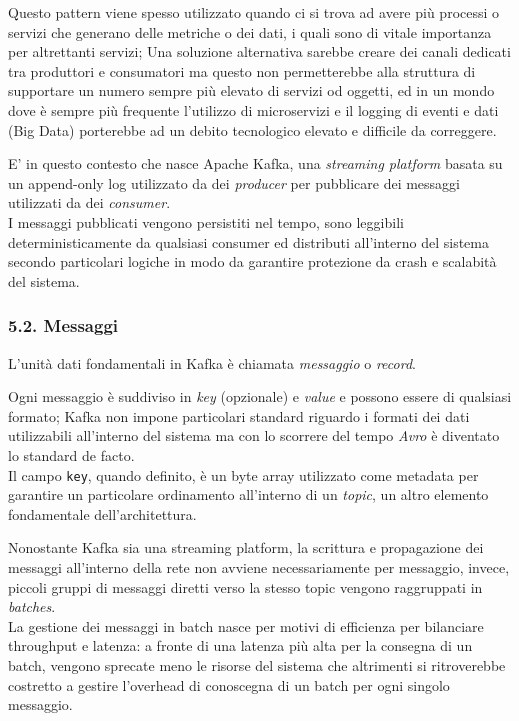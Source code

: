 \documentclass[]{article}
\begin{document}
Questo pattern viene spesso utilizzato quando ci si trova ad avere più
processi o servizi che generano delle metriche o dei dati, i quali sono
di vitale importanza per altrettanti servizi; Una soluzione alternativa
sarebbe creare dei canali dedicati tra produttori e consumatori ma
questo non permetterebbe alla struttura di supportare un numero sempre
più elevato di servizi od oggetti, ed in un mondo dove è sempre più
frequente l'utilizzo di microservizi e il logging di eventi e dati (Big
Data) porterebbe ad un debito tecnologico elevato e difficile da
correggere.

E' in questo contesto che nasce Apache Kafka, una \emph{streaming
platform} basata su un append-only log utilizzato da dei \emph{producer}
per pubblicare dei messaggi utilizzati da dei \emph{consumer}.\\
I messaggi pubblicati vengono persistiti nel tempo, sono leggibili
deterministicamente da qualsiasi consumer ed distributi all'interno del
sistema secondo particolari logiche in modo da garantire protezione da
crash e scalabità del sistema.

\newpage

\subsubsection{5.2. Messaggi}\label{messaggi}

L'unità dati fondamentali in Kafka è chiamata \emph{messaggio} o
\emph{record}.

Ogni messaggio è suddiviso in \emph{key} (opzionale) e \emph{value} e
possono essere di qualsiasi formato; Kafka non impone particolari
standard riguardo i formati dei dati utilizzabili all'interno del
sistema ma con lo scorrere del tempo \emph{Avro} è diventato lo standard
de facto.\\
Il campo \texttt{key}, quando definito, è un byte array utilizzato come
metadata per garantire un particolare ordinamento all'interno di un
\emph{topic}, un altro elemento fondamentale dell'architettura.

Nonostante Kafka sia una streaming platform, la scrittura e propagazione
dei messaggi all'interno della rete non avviene necessariamente per
messaggio, invece, piccoli gruppi di messaggi diretti verso la stesso
topic vengono raggruppati in \emph{batches}.\\
La gestione dei messaggi in batch nasce per motivi di efficienza per
bilanciare throughput e latenza: a fronte di una latenza più alta per la
consegna di un batch, vengono sprecate meno le risorse del sistema che
altrimenti si ritroverebbe costretto a gestire l'overhead di conoscegna
di un batch per ogni singolo messaggio.
\end{document}
